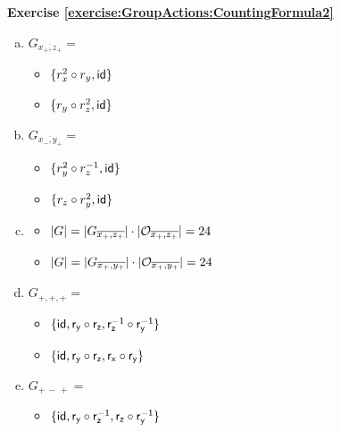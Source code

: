 \noindent\textbf{Exercise \ref{exercise:GroupActions:CountingFormula2}}
\begin{enumerate}[(a)]
\item 
$G_{\overline{x_+,z_+}}=$
	\begin{itemize}
	\item
	$\{r_x^2\circ r_y, \sf{id}\}$
	
	\item
	$\{r_y\circ r_z^2, \sf{id}\}$
	\end{itemize}
	
\item 
$G_{\overline{x_-,y_+}}=$
	\begin{itemize}
	\item
	$\{r_y^2\circ r_z^{-1}, \sf{id}\}$
	
	\item
	$\{r_z\circ r_y^{2}, \sf{id}\}$
	\end{itemize}
	
\item 
	\begin{itemize}
	\item
	$|G| = |G_{\overline{x_+,z_+}}| \cdot |{\cal O}_{\overline{x_+,z_+}}| = 24$
	
	\item
	$|G| = |G_{\overline{x_+,y_+}}| \cdot |{\cal O}_{\overline{x_+,y_+}}| = 24$
	\end{itemize}
	
\item 
$G_{+,+,+}=$
	\begin{itemize}
	\item
	$\{\sf{id}, r_y\circ r_z, r_z^{-1}\circ r_y^{-1} \}$
	
	\item
	$\{\sf{id}, r_y\circ r_z, r_x\circ r_y \}$
	\end{itemize}
	
\item 
$G_{+\,-\,+}=$
	\begin{itemize}
	\item
	$\{\sf{id}, r_y\circ r_z^{-1}, r_z\circ r_y^{-1} \}$
	

\end{itemize}
\end{enumerate}
